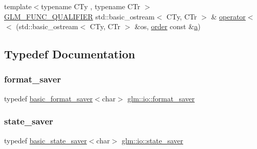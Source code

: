 \begin{DoxyCompactItemize}
\item 
{\footnotesize template$<$typename C\+Ty , typename C\+Tr $>$ }\\\hyperlink{setup_8hpp_a33fdea6f91c5f834105f7415e2a64407}{G\+L\+M\+\_\+\+F\+U\+N\+C\+\_\+\+Q\+U\+A\+L\+I\+F\+I\+ER} std\+::basic\+\_\+ostream$<$ C\+Ty, C\+Tr $>$ \& \hyperlink{namespaceglm_1_1io_a4dab7c825ecbd918643ed9fc9ef4ecb6}{operator$<$$<$} (std\+::basic\+\_\+ostream$<$ C\+Ty, C\+Tr $>$ \&os, \hyperlink{structglm_1_1io_1_1order}{order} const \&\hyperlink{_s_d_l__opengl__glext_8h_a3309789fc188587d666cda5ece79cf82}{a})
\end{DoxyCompactItemize}


\subsection{Typedef Documentation}
\mbox{\label{namespaceglm_1_1io_afdc168a994ef9e9ca4295578e9097495}} 
\subsubsection{\texorpdfstring{format\+\_\+saver}{format\_saver}}
{\footnotesize\ttfamily typedef \hyperlink{classglm_1_1io_1_1basic__format__saver}{basic\+\_\+format\+\_\+saver}$<$char$>$ \hyperlink{namespaceglm_1_1io_afdc168a994ef9e9ca4295578e9097495}{glm\+::io\+::format\+\_\+saver}}

\mbox{\label{namespaceglm_1_1io_a84d63ac771c3125d38f144dc15234764}} 
\subsubsection{\texorpdfstring{state\+\_\+saver}{state\_saver}}
{\footnotesize\ttfamily typedef \hyperlink{classglm_1_1io_1_1basic__state__saver}{basic\+\_\+state\+\_\+saver}$<$char$>$ \hyperlink{namespaceglm_1_1io_a84d63ac771c3125d38f144dc15234764}{glm\+::io\+::state\+\_\+saver}}

\mbox{\label{namespaceglm_1_1io_a6229ca888648a0ff823eb120f61de481}} 
